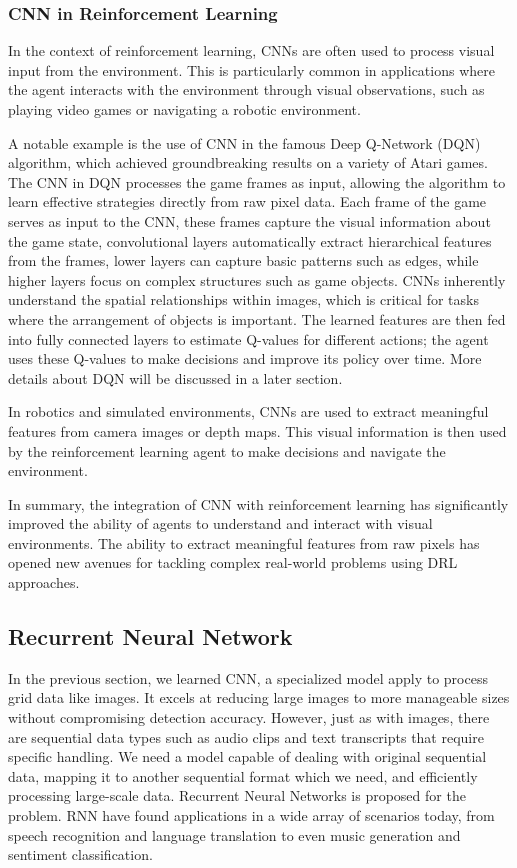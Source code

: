 \documentclass{article}
\begin{document}
\newpage
\subsubsection{CNN in Reinforcement Learning}
In the context of reinforcement learning, CNNs are often used to process visual input from the environment. This is particularly common in applications where the agent interacts with the environment through visual observations, such as playing video games or navigating a robotic environment.

A notable example is the use of CNN in the famous Deep Q-Network (DQN) algorithm, which achieved groundbreaking results on a variety of Atari games. The CNN in DQN processes the game frames as input, allowing the algorithm to learn effective strategies directly from raw pixel data. Each frame of the game serves as input to the CNN, these frames capture the visual information about the game state, convolutional layers automatically extract hierarchical features from the frames, lower layers can capture basic patterns such as edges, while higher layers focus on complex structures such as game objects. CNNs inherently understand the spatial relationships within images, which is critical for tasks where the arrangement of objects is important. The learned features are then fed into fully connected layers to estimate Q-values for different actions; the agent uses these Q-values to make decisions and improve its policy over time. More details about DQN will be discussed in a later section.

In robotics and simulated environments, CNNs are used to extract meaningful features from camera images or depth maps. This visual information is then used by the reinforcement learning agent to make decisions and navigate the environment.

In summary, the integration of CNN with reinforcement learning has significantly improved the ability of agents to understand and interact with visual environments. The ability to extract meaningful features from raw pixels has opened new avenues for tackling complex real-world problems using DRL approaches.


\newpage
\subsection{Recurrent Neural Network}

In the previous section, we learned CNN, a specialized model apply to process grid data like images. It excels at reducing large images to more manageable sizes without compromising detection accuracy. However, just as with images, there are sequential data types such as audio clips and text transcripts that require specific handling. We need a model capable of dealing with original sequential data, mapping it to another sequential format which we need, and efficiently processing large-scale data. Recurrent Neural Networks is proposed for the problem. RNN have found applications in a wide array of scenarios today, from speech recognition and language translation to even music generation and sentiment classification.
\end{document}
